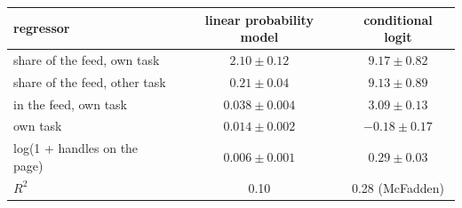 \begin{tabular}{lcc}
\toprule
regressor & linear probability model & conditional logit \\
\midrule
share of the feed, own task & $2.10 \pm 0.12$ & $9.17 \pm 0.82$ \\
share of the feed, other task & $0.21 \pm 0.04$ & $9.13 \pm 0.89$ \\
in the feed, own task & $0.038 \pm 0.004$ & $3.09 \pm 0.13$ \\
own task & $0.014 \pm 0.002$ & $-0.18 \pm 0.17$ \\
log(1 + handles on the page) & $0.006 \pm 0.001$ & $0.29 \pm 0.03$ \\
\midrule
$R^2$ & 0.10 & 0.28 (McFadden) \\
\bottomrule
\end{tabular}
